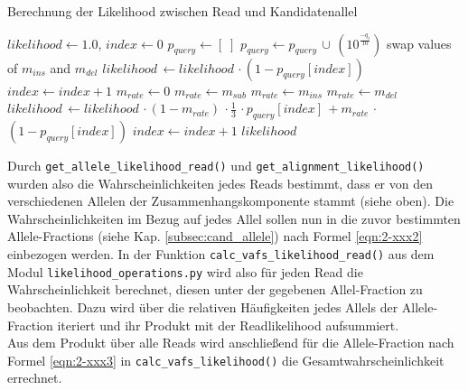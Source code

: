 \begin{algorithm}[H]
	\caption{Berechnung der Likelihood zwischen Read und Kandidatenallel}  \label{alg:lh_read}
	\begin{algorithmic}[1]	
		\State $ likelihood \gets 1.0 $, $ index \gets 0 $
		\State $ p_{query} \gets [\;] $
		\State $p_{query} \gets p_{query}\, \cup \, (10^{\frac{-q_{i}}{10}}) $
		\EndFor			
		\State swap values of $ m_{ins} $ and $ m_{del} $
		\EndIf
		\State $ likelihood\, \gets likelihood \,\cdotp (1-p_{query}[index]) $
		\State $ index \gets index + 1 $
		\EndWhile
		\EndIf
		\State $ m_{rate} \gets 0 $
		\State $ m_{rate} \gets m_{sub} $
		\EndIf
		\State $ m_{rate} \gets m_{ins} $
		\EndIf
		\State $ m_{rate} \gets m_{del} $
		\EndIf
		\State $ likelihood\, \gets likelihood \,\cdotp (1 - m_{rate})\,\cdotp \frac{1}{3} \,\cdotp p_{query}[index] \, +  m_{rate}\,\cdotp $         
		\State \hspace{63pt}  $ (1 - p_{query}[index]) $ 		        
		\State $ index \gets index + 1 $
		\EndWhile
		\EndIf
		\EndFor
		\State \Return $likelihood$
		\EndFunction		
	\end{algorithmic}
\end{algorithm}

Durch \lstinline|get_allele_likelihood_read()| und \lstinline|get_alignment_likelihood()| wurden also die Wahrscheinlichkeiten jedes Reads bestimmt, dass er von den verschiedenen Allelen der Zusammenhangskomponente stammt (siehe oben). Die Wahrscheinlichkeiten im Bezug auf jedes Allel sollen nun in die zuvor bestimmten Allele-Fractions (siehe Kap. \ref{subsec:cand_allele}) nach Formel \eqref{eqn:2-xxx2} einbezogen werden. In der Funktion \lstinline|calc_vafs_likelihood_read()| aus dem Modul \lstinline|likelihood_operations.py| wird also für jeden Read die Wahrscheinlichkeit berechnet, diesen unter der gegebenen Allel-Fraction zu beobachten. Dazu wird über die relativen Häufigkeiten jedes Allels der Allele-Fraction iteriert und ihr Produkt mit der Readlikelihood aufsummiert. \\

Aus dem Produkt über alle Reads wird anschließend für die Allele-Fraction nach Formel \eqref{eqn:2-xxx3} in \lstinline|calc_vafs_likelihood()| die Gesamtwahrscheinlichkeit errechnet. \\

